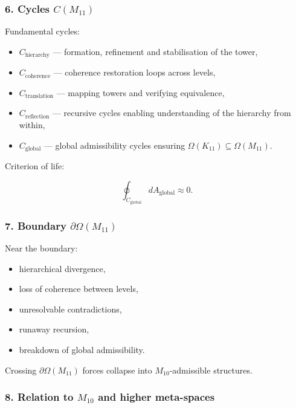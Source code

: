\subsubsection*{6. Cycles $C(M_{11})$}

Fundamental cycles:

\begin{itemize}
    \item $C_{\mathrm{hierarchy}}$ — formation, refinement and stabilisation of the tower,
    \item $C_{\mathrm{coherence}}$ — coherence restoration loops across levels,
    \item $C_{\mathrm{translation}}$ — mapping towers and verifying equivalence,
    \item $C_{\mathrm{reflection}}$ — recursive cycles enabling 
          understanding of the hierarchy from within,
    \item $C_{\mathrm{global}}$ — global admissibility cycles ensuring
          $\Omega(K_{11})\subseteq\Omega(M_{11})$.
\end{itemize}

Criterion of life:

\[
\oint_{C_{\mathrm{global}}} dA_{\mathrm{global}} \approx 0.
\]

\subsubsection*{7. Boundary $\partial\Omega(M_{11})$}

Near the boundary:

\begin{itemize}
    \item hierarchical divergence,
    \item loss of coherence between levels,
    \item unresolvable contradictions,
    \item runaway recursion,
    \item breakdown of global admissibility.
\end{itemize}

Crossing $\partial\Omega(M_{11})$ forces collapse into $M_{10}$-admissible structures.

\subsubsection*{8. Relation to $M_{10}$ and higher meta-spaces}


